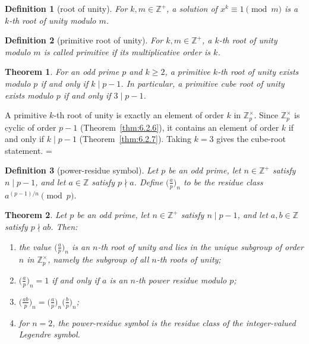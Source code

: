 \documentclass[11pt]{article}
\makeatletter
\let\nt@closedisplay\]
\def\nt@guardedclose{\@ifnextchar\par{\nt@closeafterpar}{\@ifnextchar\end{\postdisplaypenalty\@M\nt@closedisplay}{\nt@closedisplay}}}
\def\nt@closeafterpar\par{\@ifnextchar\par{\nt@closeafterpar}{\@ifnextchar\end{\postdisplaypenalty\@M\nt@closedisplay\par}{\nt@closedisplay\par}}}
\renewenvironment{proof}[1][\proofname]{\par
  \pushQED{\qed}\normalfont\topsep\medskipamount\edef\nt@afterproof{\@endparpenalty=\the\@endparpenalty\relax}\@beginparpenalty\@M\@endparpenalty\@M\let\]\nt@guardedclose\trivlist\item[]\textit{#1\@addpunct{.}} \ignorespaces}{\ifvmode\addpenalty\@M\fi\popQED\nt@afterproof\endtrivlist\@endpefalse}
\theoremstyle{ntstyle}
\newtheorem{theorem}{Theorem}[subsection]
\newtheorem{definition}{Definition}[subsection]
\newcommand{\plegs}[3]{\bigl(\tfrac{#1}{#2}\bigr)_{#3}}
\newcommand{\ZmodUnits}[1]{\mathbb{Z}_{#1}^{\times}}
\makeatother
\begin{document}
\begin{definition}[root of unity]\label{def:7.7.3}\label{def:root-of-unity}
  For $k,m\in\mathbb{Z}^+$, a solution of $x^k\equiv1\pmod{m}$ is a $k$-th root of unity modulo
  $m$.

\end{definition}

\begin{definition}[primitive root of unity]\label{def:7.7.4}\label{def:primitive-root-of-unity}
  For $k,m\in\mathbb{Z}^+$, a $k$-th root of unity modulo $m$ is called primitive if its multiplicative order is
  $k$.

\end{definition}

\begin{theorem}\label{thm:7.7.2} For
  an odd prime $p$ and $k \ge 2$, a primitive $k$-th root of unity
  exists modulo $p$ if and only if $k \mid p - 1$. In particular, a primitive cube
  root of unity exists modulo $p$ if and only if $3 \mid p - 1$.

\end{theorem}

\begin{proof} A primitive $k$-th root of unity is exactly
  an element of order $k$ in $\ZmodUnits{p}$. Since
  $\ZmodUnits{p}$ is cyclic of order $p-1$ (Theorem~\ref{thm:6.2.6}), it
  contains
  an element of order $k$ if and only if $k \mid p-1$ (Theorem~\ref{thm:6.2.7}). Taking $k = 3$ gives the cube-root
  statement.
\end{proof}

\begin{definition}[power-residue symbol]\label{def:7.7.5}\label{def:power-residue-symbol}
  Let $p$
  be an odd prime, let $n\in\mathbb{Z}^+$ satisfy $n\mid p-1$, and let
  $a\in\mathbb{Z}$ satisfy $p\nmid a$. Define $\plegs{a}{p}{n}$
  to be the residue class $a^{(p-1)/n}\pmod{p}$.

\end{definition}

\begin{theorem}\label{thm:7.7.3} Let $p$ be an odd prime, let $n\in\mathbb{Z}^+$
  satisfy $n\mid p-1$, and let $a,b\in\mathbb{Z}$ satisfy $p\nmid ab$.
  Then:
  \begin{enumerate}[label={\alph*)}]
    \item the value $\plegs{a}{p}{n}$ is an $n$-th root of unity and lies
          in the unique subgroup of order $n$ in $\ZmodUnits{p}$, namely
          the subgroup of all $n$-th roots of unity;
    \item $\plegs{a}{p}{n}=1$ if and only if $a$ is an $n$-th power
          residue modulo $p$;
    \item $\plegs{ab}{p}{n}=\plegs{a}{p}{n}\plegs{b}{p}{n}$;
    \item for $n=2$, the power-residue symbol is the residue class of the integer-valued Legendre symbol.
  \end{enumerate}

\end{theorem}
\end{document}
